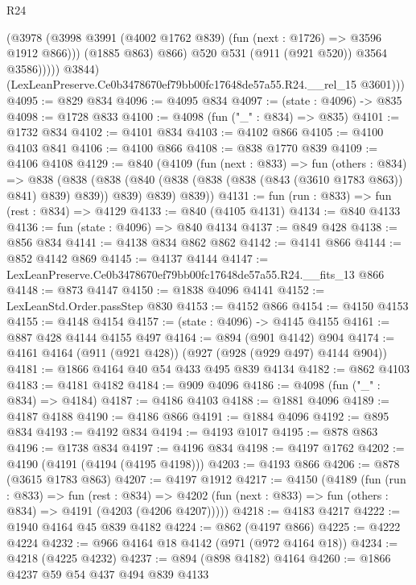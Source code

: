 \begin{lexlean}{R24}
\begin{coremodule}
                      (@3978
                        (@3998 @3991 (@4002 @1762 @839) (fun (next : @1726) => @3596 @1912 @866)))
                      (@1885 @863)
                      @866)
                    @520
                    @531
                    (@911 (@921 @520))
                    @3564
                    @3586)))))
          @3844)
        (LexLeanPreserve.Ce0b3478670ef79bb00fc17648de57a55.R24.__rel_15 @3601)))
@4095 := @829 @834
@4096 := @4095 @834
@4097 := (state : @4096) -> @835
@4098 := @1728 @833
@4100 := @4098 (fun ("_" : @834) => @835)
@4101 := @1732 @834
@4102 := @4101 @834
@4103 := @4102 @866
@4105 := @4100 @4103 @841
@4106 := @4100 @866
@4108 := @838 @1770 @839
@4109 := @4106 @4108
@4129 := @840
    (@4109
      (fun (next : @833) =>
      fun (others : @834) =>
      @838
        (@838 (@838 (@840 (@838 (@838 (@838 (@843 (@3610 @1783 @863)) @841) @839) @839)) @839) @839)
        @839))
@4131 := fun (run : @833) => fun (rest : @834) => @4129
@4133 := @840 (@4105 @4131)
@4134 := @840 @4133
@4136 := fun (state : @4096) => @840 @4134
@4137 := @849 @428
@4138 := @856 @834
@4141 := @4138 @834 @862 @862
@4142 := @4141 @866
@4144 := @852 @4142 @869
@4145 := @4137 @4144
@4147 := LexLeanPreserve.Ce0b3478670ef79bb00fc17648de57a55.R24.__fits_13 @866
@4148 := @873 @4147
@4150 := @1838 @4096 @4141
@4152 := LexLeanStd.Order.passStep @830
@4153 := @4152 @866
@4154 := @4150 @4153
@4155 := @4148 @4154
@4157 := (state : @4096) -> @4145 @4155
@4161 := @887 @428 @4144 @4155 @497
@4164 := @894 (@901 @4142) @904
@4174 := @4161 @4164 (@911 (@921 @428)) (@927 (@928 (@929 @497) @4144 @904))
@4181 := @1866 @4164 @40 @54 @433 @495 @839 @4134
@4182 := @862 @4103
@4183 := @4181 @4182
@4184 := @909 @4096
@4186 := @4098 (fun ("_" : @834) => @4184)
@4187 := @4186 @4103
@4188 := @1881 @4096
@4189 := @4187 @4188
@4190 := @4186 @866
@4191 := @1884 @4096
@4192 := @895 @834
@4193 := @4192 @834
@4194 := @4193 @1017
@4195 := @878 @863
@4196 := @1738 @834
@4197 := @4196 @834
@4198 := @4197 @1762
@4202 := @4190 (@4191 (@4194 (@4195 @4198)))
@4203 := @4193 @866
@4206 := @878 (@3615 @1783 @863)
@4207 := @4197 @1912
@4217 := @4150
    (@4189
      (fun (run : @833) =>
      fun (rest : @834) =>
      @4202 (fun (next : @833) => fun (others : @834) => @4191 (@4203 (@4206 @4207)))))
@4218 := @4183 @4217
@4222 := @1940 @4164 @45 @839 @4182
@4224 := @862 (@4197 @866)
@4225 := @4222 @4224
@4232 := @966 @4164 @18 @4142 (@971 (@972 @4164 @18))
@4234 := @4218 (@4225 @4232)
@4237 := @894 (@898 @4182) @4164
@4260 := @1866
    @4237
    @59
    @54
    @437
    @494
    @839
    @4133

\end{coremodule}
\end{lexlean}
